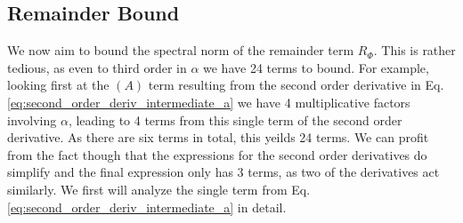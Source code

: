 \documentclass{article}
\begin{document}
\subsection{Remainder Bound}
We now aim to bound the spectral norm of the remainder term $R_{\Phi}$. This is rather tedious, as even to third order in $\alpha$ we have 24 terms to bound. For example, looking first at the $(A)$ term resulting from the second order derivative in Eq. \eqref{eq:second_order_deriv_intermediate_a} we have 4 multiplicative factors involving $\alpha$, leading to 4 terms from this single term of the second order derivative. As there are six terms in total, this yeilds 24 terms. We can profit from the fact though that the expressions for the second order derivatives do simplify and the final expression only has 3 terms, as two of the derivatives act similarly. We first will analyze the single term from Eq. \eqref{eq:second_order_deriv_intermediate_a} in detail. 
\end{document}
